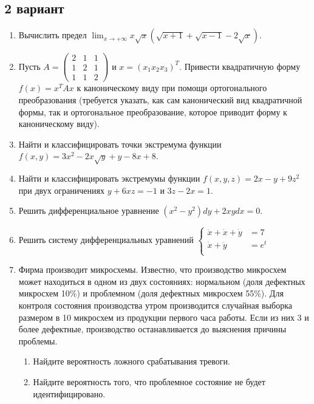 \documentclass[pdftex,12pt,a4paper]{article}
\begin{document}
\subsection{2 вариант}
\begin{enumerate}
\item Вычислить предел $\lim_{x\to +\infty} x \sqrt{x}(\sqrt{x+1}+\sqrt{x-1}-2\sqrt{x})$.\\
\item Пусть $A=
\left(\begin{array}{ccc}
2 & 1 & 1\\
1 & 2 & 1\\
1 & 1 & 2
\end{array}\right)$ и $x=(x_1 x_2 x_3)^T$. Привести квадратичную форму $f(x)=x^T Ax$ к каноническому виду при помощи ортогонального преобразования (требуется указать, как сам канонический вид квадратичной формы, так и ортогональное преобразование, которое приводит форму к каноническому виду).\\
\item Найти и классифицировать точки экстремума функции $f(x,y)=3x^2-2x\sqrt{y}+y-8x+8$.\\
\item Найти и классифицировать экстремумы функции $f(x,y,z)=2x-y+9z^2$ при двух ограничениях $y+6xz=-1$ и $3z-2x=1$.\\
\item Решить дифференциальное уравнение $(x^2-y^2)dy + 2xydx=0$.\\
\item Решить систему дифференциальных уравнений 
$\left\{
\begin{aligned}
\ddot{x}+\dot{x}+\dot{y} & = 7\\
\dot{x}+\ddot{y}         & = e^t\\
\end{aligned}\right.$\\
\item Фирма производит микросхемы. Известно, что производство микросхем может находиться в одном из двух состояниях: нормальном (доля дефектных микросхем 10\%) и проблемном (доля дефектных микросхем 55\%). Для контроля состояния производства утром производится случайная выборка размером в 10 микросхем из продукции первого часа работы. Если из них 3 и более дефектные, производство останавливается до выяснения причины проблемы.
\begin{enumerate}
\item Найдите вероятность ложного срабатывания тревоги.
\item Найдите вероятность того, что проблемное состояние не будет идентифицировано.

\end{enumerate}
\end{enumerate}
\end{document}
